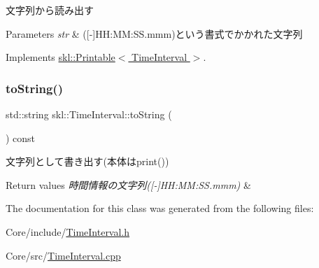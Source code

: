 文字列から読み出す 


\begin{DoxyParams}{Parameters}
{\em str} & (\mbox{[}-\/\mbox{]}H\+H\+:\+MM\+:S\+S.\+mmm)という書式でかかれた文字列 \\
\hline
\end{DoxyParams}


Implements \hyperlink{classskl_1_1_printable}{skl\+::\+Printable$<$ Time\+Interval $>$}.

\hypertarget{classskl_1_1_time_interval_a371c857881c27d68bff36e169646126a}{}\label{classskl_1_1_time_interval_a371c857881c27d68bff36e169646126a} 
\subsubsection{\texorpdfstring{to\+String()}{toString()}}
{\footnotesize\ttfamily std\+::string skl\+::\+Time\+Interval\+::to\+String (\begin{DoxyParamCaption}{ }\end{DoxyParamCaption}) const}



文字列として書き出す(本体はprint()) 


\begin{DoxyRetVals}{Return values}
{\em 時間情報の文字列(\mbox{[}-\/\mbox{]}\+H\+H\+:\+M\+M\+:\+S\+S.\+mmm)} & \\
\hline
\end{DoxyRetVals}


The documentation for this class was generated from the following files\+:\begin{DoxyCompactItemize}
\item 
Core/include/\hyperlink{_time_interval_8h}{Time\+Interval.\+h}\item 
Core/src/\hyperlink{_time_interval_8cpp}{Time\+Interval.\+cpp}\end{DoxyCompactItemize}
